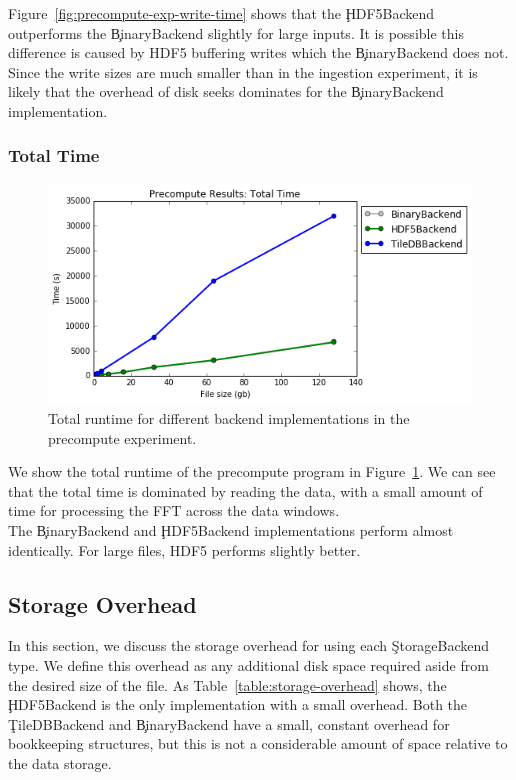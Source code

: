 Figure~\ref{fig:precompute-exp-write-time} shows that the \c{HDF5Backend}
outperforms the \c{BinaryBackend} slightly for large inputs. It is possible
this difference is caused by HDF5 buffering writes which the \c{BinaryBackend}
does not. Since the write sizes are much smaller than in the ingestion
experiment, it is likely that the overhead of disk seeks dominates for the
\c{BinaryBackend} implementation. \\

\subsubsection{Total Time}

\begin{figure}[h]
\begin{center}
\includegraphics[scale=0.75]{./img/precompute-exp-total-time.png}
\caption{Total runtime for different backend implementations in the precompute
  experiment.}
\label{fig:precompute-exp-total-time}
\end{center}
\end{figure}

We show the total runtime of the precompute program in
Figure~\ref{fig:precompute-exp-total-time}. We can see that the total time is
dominated by reading the data, with a small amount of time for processing the
FFT across the data windows. \\

The \c{BinaryBackend} and \c{HDF5Backend} implementations perform almost
identically. For large files, HDF5 performs slightly better.

\subsection{Storage Overhead}

In this section, we discuss the storage overhead for using each
\c{StorageBackend} type. We define this overhead as any additional disk space
required aside from the desired size of the file. As
Table~\ref{table:storage-overhead} shows, the \c{HDF5Backend} is the only
implementation with a small overhead. Both the \c{TileDBBackend} and
\c{BinaryBackend} have a small, constant overhead for bookkeeping structures,
but this is not a considerable amount of space relative to the data storage. \\

